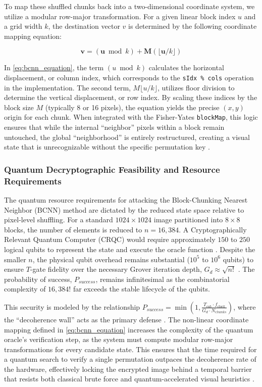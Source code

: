\documentclass[12pt,fleqn]{article}
\begin{document}
To map these shuffled chunks back into a two-dimensional coordinate system, we utilize a modular row-major transformation. For a given linear block index $u$ and a grid width $k$, the destination vector $v$ is determined by the following coordinate mapping equation:

\begin{equation} \label{eq:bcnn_equation}
\mathbf{v} = (\mathbf{u} \bmod k) + \mathbf{M} \left(\lfloor \mathbf{u}/k \rfloor \right)
\end{equation}

In \eqref{eq:bcnn_equation}, the term $(u \bmod k)$ calculates the horizontal displacement, or column index, which corresponds to the \texttt{sIdx \% cols} operation in the implementation. The second term, $M \lfloor u/k \rfloor$, utilizes floor division to determine the vertical displacement, or row index. By scaling these indices by the block size $M$ (typically 8 or 16 pixels), the equation yields the precise $(x, y)$ origin for each chunk. When integrated with the Fisher-Yates \texttt{blockMap}, this logic ensures that while the internal ``neighbor'' pixels within a block remain untouched, the global ``neighborhood'' is entirely restructured, creating a visual state that is unrecognizable without the specific permutation key \cite{zhou2015image}.

\subsubsection{Quantum Decryptographic Feasibility and Resource Requirements}

The quantum resource requirements for attacking the Block-Chunking Nearest Neighbor (BCNN) method are dictated by the reduced state space relative to pixel-level shuffling. For a standard $1024 \times 1024$ image partitioned into $8 \times 8$ blocks, the number of elements is reduced to $n = 16,384$. A Cryptographically Relevant Quantum Computer (CRQC) would require approximately $150$ to $250$ logical qubits to represent the state and execute the oracle function \cite{fowler2012surface}. Despite the smaller $n$, the physical qubit overhead remains substantial ($10^5$ to $10^6$ qubits) to ensure $T$-gate fidelity over the necessary Grover iteration depth, $G_d \approx \sqrt{n!}$ \cite{gidney2021factor}. The probability of success, $P_{success}$, remains infinitesimal as the combinatorial complexity of $16,384!$ far exceeds the stable lifecycle of the qubits.

This security is modeled by the relationship $P_{success} = \min(1, \frac{T_{coh} \cdot f_{clock}}{G_d \cdot N_{chunks}})$, where the ``decoherence wall'' acts as the primary defense \cite{preskill2018quantum}. The non-linear coordinate mapping defined in \eqref{eq:bcnn_equation} increases the complexity of the quantum oracle's verification step, as the system must compute modular row-major transformations for every candidate state. This ensures that the time required for a quantum search to verify a single permutation outpaces the decoherence rate of the hardware, effectively locking the encrypted image behind a temporal barrier that resists both classical brute force and quantum-accelerated visual heuristics \cite{shor1994quantum}.
\end{document}
